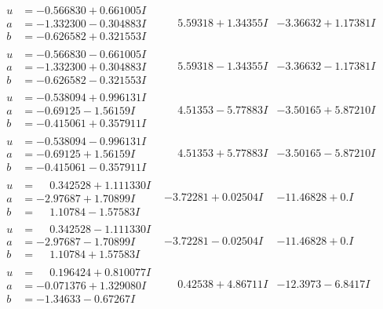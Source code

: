 \documentclass[1p]{elsarticle_modified}
\theoremstyle{definition}
\begin{document}
$$\begin{array}{c|c|c}
\begin{aligned}
u &= -0.566830 + 0.661005 I \\
a &= -1.332300 - 0.304883 I \\
b &= -0.626582 + 0.321553 I\end{aligned}
 & \phantom{-}5.59318 + 1.34355 I & -3.36632 + 1.17381 I \\ \hline\begin{aligned}
u &= -0.566830 - 0.661005 I \\
a &= -1.332300 + 0.304883 I \\
b &= -0.626582 - 0.321553 I\end{aligned}
 & \phantom{-}5.59318 - 1.34355 I & -3.36632 - 1.17381 I \\ \hline\begin{aligned}
u &= -0.538094 + 0.996131 I \\
a &= -0.69125 - 1.56159 I \\
b &= -0.415061 + 0.357911 I\end{aligned}
 & \phantom{-}4.51353 - 5.77883 I & -3.50165 + 5.87210 I \\ \hline\begin{aligned}
u &= -0.538094 - 0.996131 I \\
a &= -0.69125 + 1.56159 I \\
b &= -0.415061 - 0.357911 I\end{aligned}
 & \phantom{-}4.51353 + 5.77883 I & -3.50165 - 5.87210 I \\ \hline\begin{aligned}
u &= \phantom{-}0.342528 + 1.111330 I \\
a &= -2.97687 + 1.70899 I \\
b &= \phantom{-}1.10784 - 1.57583 I\end{aligned}
 & -3.72281 + 0.02504 I & -11.46828 + 0. I\phantom{ +0.000000I} \\ \hline\begin{aligned}
u &= \phantom{-}0.342528 - 1.111330 I \\
a &= -2.97687 - 1.70899 I \\
b &= \phantom{-}1.10784 + 1.57583 I\end{aligned}
 & -3.72281 - 0.02504 I & -11.46828 + 0. I\phantom{ +0.000000I} \\ \hline\begin{aligned}
u &= \phantom{-}0.196424 + 0.810077 I \\
a &= -0.071376 + 1.329080 I \\
b &= -1.34633 - 0.67267 I\end{aligned}
 & \phantom{-}0.42538 + 4.86711 I & -12.3973 - 6.8417 I \\ \hline\begin{aligned}

\end{aligned}
\end{array}$$
\end{document}
